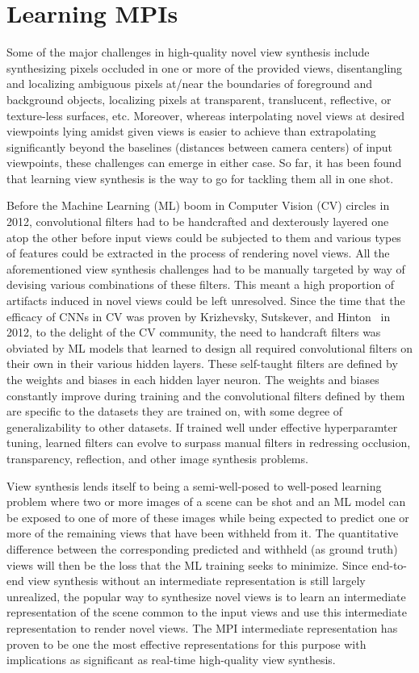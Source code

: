 \section{Learning MPIs}\label{sec:learning-mpis} 

Some of the major challenges in high-quality novel view synthesis include synthesizing pixels occluded in one or more of the provided views, disentangling and localizing ambiguous pixels at/near the boundaries of foreground and background objects, localizing pixels at transparent, translucent, reflective, or texture-less surfaces, etc. Moreover, whereas interpolating novel views at desired viewpoints lying amidst given views is easier to achieve than extrapolating significantly beyond the baselines (distances between camera centers) of input viewpoints, these challenges can emerge in either case. So far, it has been found that learning view synthesis is the way to go for tackling them all in one shot.

Before the Machine Learning (ML) boom in Computer Vision (CV) circles in 2012, convolutional filters had to be handcrafted and dexterously layered one atop the other before input views could be subjected to them and various types of features could be extracted in the process of rendering novel views. All the aforementioned view synthesis challenges had to be manually targeted by way of devising various combinations of these filters. This meant a high proportion of artifacts induced in novel views could be left unresolved. Since the time that the efficacy of CNNs in CV was proven by Krizhevsky, Sutskever, and Hinton~\cite{krizhevsky_imagenet_2012} in 2012, to the delight of the CV community, the need to handcraft filters was obviated by ML models that learned to design all required convolutional filters on their own in their various hidden layers. These self-taught filters are defined by the weights and biases in each hidden layer neuron. The weights and biases constantly improve during training and the convolutional filters defined by them are specific to the datasets they are trained on, with some degree of generalizability to other datasets. If trained well under effective hyperparamter tuning, learned filters can evolve to surpass manual filters in redressing occlusion, transparency, reflection, and other image synthesis problems.

View synthesis lends itself to being a semi-well-posed to well-posed learning problem where two or more images of a scene can be shot and an ML model can be exposed to one of more of these images while being expected to predict one or more of the remaining views that have been withheld from it. The quantitative difference between the corresponding predicted and withheld (as ground truth) views will then be the loss that the ML training seeks to minimize. Since end-to-end view synthesis without an intermediate representation is still largely unrealized, the popular way to synthesize novel views is to learn an intermediate representation of the scene common to the input views and use this intermediate representation to render novel views. The MPI intermediate representation has proven to be one the most effective representations for this purpose with implications as significant as real-time high-quality view synthesis.

